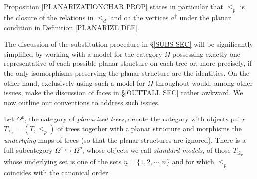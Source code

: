 \documentclass[a4paper,10pt]{article}%
\begin{document}
\begin{remark}\label{CLOSURE REM}
Proposition \ref{PLANARIZATIONCHAR PROP} states in particular that $\leq_p$
is the closure of the relations in $\leq_d$	and on the vertices
$a^{\uparrow}$ under the planar condition in 
Definition \ref{PLANARIZE DEF}.
\end{remark}


The discussion of the substitution procedure in \S \ref{SUBS SEC} 
will be significantly simplified by working with 
a model for the category $\Omega$
possessing exactly one representative
of each possible planar structure on each tree or, more precisely, if the only isomorphisms preserving the planar structure are the identities.
On the other hand, exclusively using such a model for $\Omega$ throughout would, among other issues, make the discussion of faces in \S \ref{OUTTALL SEC} rather awkward.
We now outline our conventions to address such issues.

Let $\Omega^p$, the category of \textit{planarized trees}, denote the category with objects pairs $T_{\leq_p}=(T,\leq_p)$ of trees together with a planar structure  and morphisms the \textit{underlying} maps of trees (so that the planar structures are ignored).
There is a full subcategory $\Omega^s \hookrightarrow \Omega^p$, whose objects we call \textit{standard models}, of those $T_{\leq_p}$ whose underlying set is one of the sets $\underline{n} = \{1,2,\cdots,n\}$ and for which $\leq_p$ coincides with the canonical order.
\end{document}

